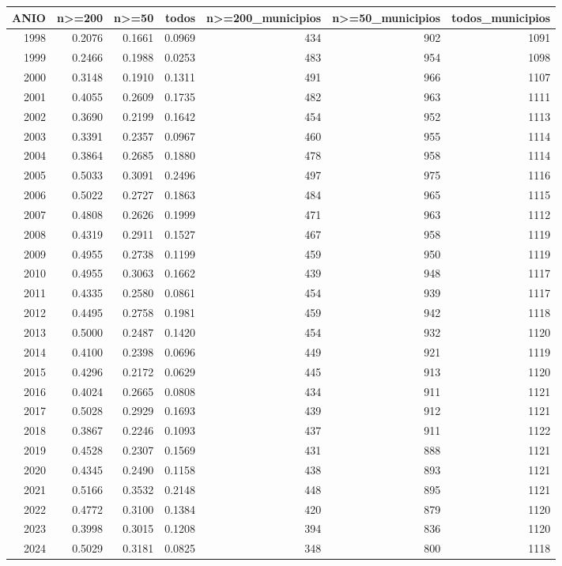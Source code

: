 \begin{tabular}{rrrrrrr}
\toprule
ANIO & n>=200 & n>=50 & todos & n>=200\_municipios & n>=50\_municipios & todos\_municipios \\
\midrule
1998 & 0.2076 & 0.1661 & 0.0969 & 434 & 902 & 1091 \\
1999 & 0.2466 & 0.1988 & 0.0253 & 483 & 954 & 1098 \\
2000 & 0.3148 & 0.1910 & 0.1311 & 491 & 966 & 1107 \\
2001 & 0.4055 & 0.2609 & 0.1735 & 482 & 963 & 1111 \\
2002 & 0.3690 & 0.2199 & 0.1642 & 454 & 952 & 1113 \\
2003 & 0.3391 & 0.2357 & 0.0967 & 460 & 955 & 1114 \\
2004 & 0.3864 & 0.2685 & 0.1880 & 478 & 958 & 1114 \\
2005 & 0.5033 & 0.3091 & 0.2496 & 497 & 975 & 1116 \\
2006 & 0.5022 & 0.2727 & 0.1863 & 484 & 965 & 1115 \\
2007 & 0.4808 & 0.2626 & 0.1999 & 471 & 963 & 1112 \\
2008 & 0.4319 & 0.2911 & 0.1527 & 467 & 958 & 1119 \\
2009 & 0.4955 & 0.2738 & 0.1199 & 459 & 950 & 1119 \\
2010 & 0.4955 & 0.3063 & 0.1662 & 439 & 948 & 1117 \\
2011 & 0.4335 & 0.2580 & 0.0861 & 454 & 939 & 1117 \\
2012 & 0.4495 & 0.2758 & 0.1981 & 459 & 942 & 1118 \\
2013 & 0.5000 & 0.2487 & 0.1420 & 454 & 932 & 1120 \\
2014 & 0.4100 & 0.2398 & 0.0696 & 449 & 921 & 1119 \\
2015 & 0.4296 & 0.2172 & 0.0629 & 445 & 913 & 1120 \\
2016 & 0.4024 & 0.2665 & 0.0808 & 434 & 911 & 1121 \\
2017 & 0.5028 & 0.2929 & 0.1693 & 439 & 912 & 1121 \\
2018 & 0.3867 & 0.2246 & 0.1093 & 437 & 911 & 1122 \\
2019 & 0.4528 & 0.2307 & 0.1569 & 431 & 888 & 1121 \\
2020 & 0.4345 & 0.2490 & 0.1158 & 438 & 893 & 1121 \\
2021 & 0.5166 & 0.3532 & 0.2148 & 448 & 895 & 1121 \\
2022 & 0.4772 & 0.3100 & 0.1384 & 420 & 879 & 1120 \\
2023 & 0.3998 & 0.3015 & 0.1208 & 394 & 836 & 1120 \\
2024 & 0.5029 & 0.3181 & 0.0825 & 348 & 800 & 1118 \\
\bottomrule
\end{tabular}
